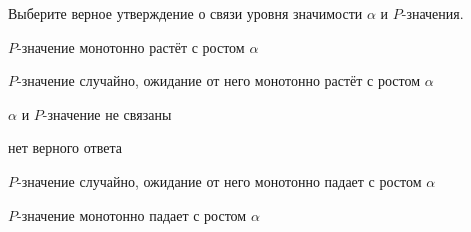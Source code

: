 
\begin{question}
Выберите верное утверждение о связи уровня значимости \(\alpha\) и
\(P\)-значения.
\begin{answerlist}
  \item \(P\)-значение монотонно растёт с ростом \(\alpha\)
  \item \(P\)-значение случайно, ожидание от него монотонно растёт с ростом
\(\alpha\)
  \item \(\alpha\) и \(P\)-значение не связаны
  \item нет верного ответа
  \item \(P\)-значение случайно, ожидание от него монотонно падает с ростом
\(\alpha\)
  \item \(P\)-значение монотонно падает с ростом \(\alpha\)
\end{answerlist}
\end{question}


